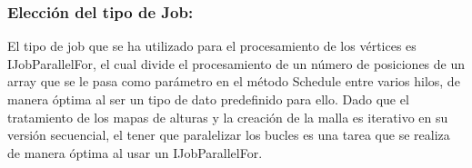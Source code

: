 \subsubsection{Elección del tipo de Job:}
El tipo de job que se ha utilizado para el procesamiento de los vértices es IJobParallelFor, el cual divide el procesamiento de un número de posiciones de un array que se le pasa como parámetro en el método Schedule entre varios hilos, de manera óptima al ser un tipo de dato predefinido para ello. Dado que el tratamiento de los mapas de alturas y la creación de la malla es iterativo en su versión secuencial, el tener que paralelizar los bucles es una tarea que se realiza de manera óptima al usar un IJobParallelFor.





